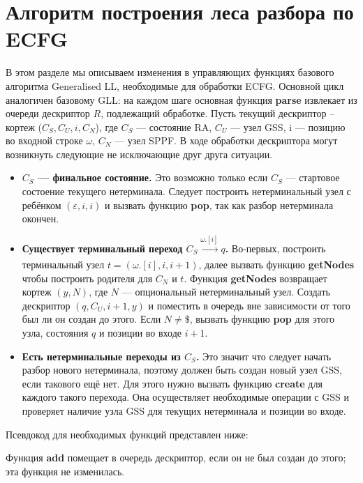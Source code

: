 \documentclass[12pt]{matmex-diploma-custom}
\begin{document}
	\section{Алгоритм построения леса разбора по ECFG}
	В этом разделе мы описываем изменения в управляющих функциях базового алгоритма 
	Generalised LL, необходимые для обработки ECFG. Основной цикл аналогичен базовому
	GLL: на каждом шаге основная функция \textbf{parse} извлекает из очереди дескриптор
	$R$, подлежащий обработке. Пусть текущий дескриптор -- кортеж ($C_S, C_U, i, C_N$),
	где $C_S$ --- состояние RA, $C_U$ --- узел GSS, i --- позицию во входной строке 
	$\omega$, $C_N$ --- узел SPPF. В ходе обработки дескриптора могут возникнуть следующие
	не исключающие друг друга ситуации.
	\begin{itemize} 
		\item \textbf{$C_S$ --- финальное состояние.} Это возможно только если $C_S$
		--- стартовое состоение текущего нетерминала. Следует построить нетерминальный
		узел с ребёнком $(\varepsilon, i, i)$ и вызвать функцию \textbf{pop}, так как
		разбор нетерминала окончен.
		
		\item \textbf{Существует терминальный переход $C_S \xrightarrow[]{\omega.[i]} q$.}
		Во-первых, построить терминальный узел $ t = (\omega.[i], i, i+1) $, далее 
		вызвать функцию \textbf{getNodes} чтобы построить родителя для $ C_N $ и $ t $. 
		Функция \textbf{getNodes} возвращает кортеж $ (y, N) $, где $N$ --- опциональный
		нетерминальный узел. Создать дескриптор $ (q, C_U, i+1, y) $ и поместить в 
		очередь вне зависимости от того был ли он создан до этого. Если $ N \neq \$$,
		вызвать функцию \textbf{pop} для этого узла, состояния $ q $ и позиции во
		входе $ i + 1 $.
		
		\item\textbf{ Есть нетерминальные переходы из $C_S$.}
		Это значит что следует начать разбор нового нетерминала, поэтому должен быть
		создан новый узел GSS, если такового ещё нет. Для этого нужно вызвать функцию
		\textbf{create} для каждого такого перехода. Она осуществляет необходимые
		операции с GSS и проверяет наличие узла GSS для текущих нетерминала и 
		позиции во входе.
	\end{itemize}
	
	Псевдокод для необходимых функций представлен ниже:
	
	Функция \textbf{add} помещает в очередь дескриптор, если он не был создан до этого; эта функция не изменилась.
	
	
\end{document}
